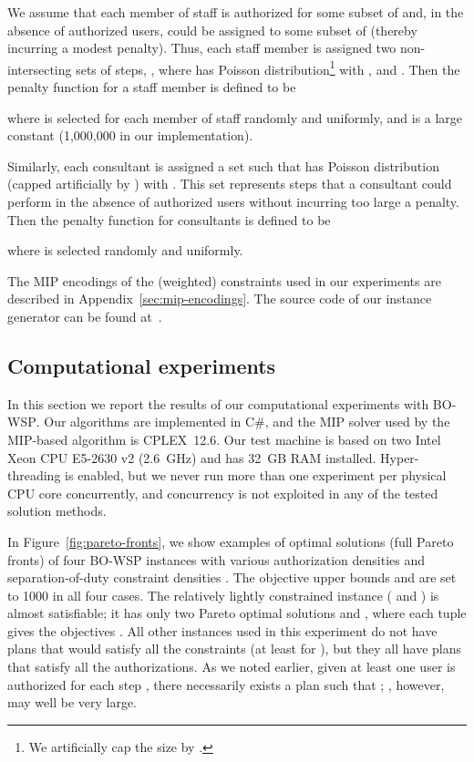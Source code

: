 \documentclass[jcs,crcready]{iosart1c}
\newcommand{\BOWSP}{\textsc{BO-WSP}\xspace}
\begin{document}
 We assume that each member of staff  is authorized for some subset  of  and, in the absence of authorized users, could be assigned to some subset  of  (thereby incurring a modest penalty).
 Thus, each staff member  is assigned two non-intersecting sets of steps, , where  has Poisson distribution\footnote{We artificially cap the size  by .} with , and .
 Then the penalty function  for a staff member  is defined to be 
   
 where  is selected for each member of staff randomly and uniformly, and  is a large constant (1,000,000 in our implementation).
 
 Similarly, each consultant  is assigned a set  such that  has Poisson distribution (capped artificially by ) with .
 This set represents steps that a consultant could perform in the absence of authorized users without incurring too large a penalty.
 Then the penalty function for consultants is defined to be
 
 where  is selected randomly and uniformly.
 
 The MIP encodings of the (weighted) constraints used in our experiments are described in Appendix~\ref{sec:mip-encodings}. 
 The source code of our instance generator can be found at~\cite{sourceSACMAT2015}. 

 
\subsection{Computational experiments}
\label{sec:experimentsresults}

 In this section we report the results of our computational experiments with \BOWSP.
 Our algorithms are implemented in C\#, and the MIP solver used by the MIP-based algorithm is CPLEX~12.6.
 Our test machine is based on two Intel Xeon CPU E5-2630 v2 (2.6~GHz) and has 32~GB RAM installed.
 Hyper-threading is enabled, but we never run more than one experiment per physical CPU core concurrently, and concurrency is not exploited in any of the tested solution methods.
 
 In Figure~\ref{fig:pareto-fronts}, we show examples of optimal solutions (full Pareto fronts) of four \BOWSP instances with various authorization densities  and separation-of-duty constraint densities .
 The objective upper bounds  and  are set to 1000 in all four cases.
 The relatively lightly constrained instance ( and ) is almost satisfiable; it has only two Pareto optimal solutions  and , where each tuple gives the objectives .
 All other instances used in this experiment do not have plans that would satisfy all the constraints (at least for ), but they all have plans that satisfy all the authorizations.
 As we noted earlier, given at least one user is authorized for each step , there necessarily exists a plan  such that ; , however, may well be very large.
\end{document}
